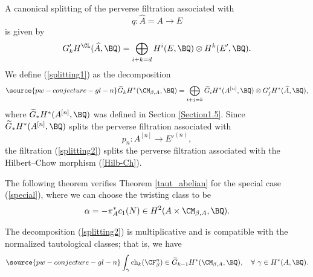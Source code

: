 A canonical splitting of the perverse filtration associated with
\[
q: \widehat{A} =A \to E
\]
is given by
\[
G'_kH^\CL(\widehat{A}, \BQ) = \bigoplus_{i+k =d} H^i(E, \BQ)\otimes H^k(E',\BQ).
\]
We define (\ref{splitting1}) as the decomposition
\begin{equation}\label{splitting2}
\source{pw-conjecture-gl-n}
\widetilde{G}_kH^\ast(\CM_{\beta, A}, \BQ) = \bigoplus_{i+j=k}  \widetilde{G}_i H^\ast(A^{[n]}, \BQ) \otimes G'_jH^\ast(\widehat{A},\BQ),
\end{equation}
where
$\widetilde{G}_\ast H^\ast(A^{[n]}, \BQ)$ was defined in Section \ref{Section1.5}.
Since $\widetilde{G}_\ast H^\ast(A^{[n]}, \BQ)$ splits the perverse filtration associated with
\[
p_n:  A^{[n]} \to E'^{(n)},
\]
the filtration (\ref{splitting2}) splits the perverse filtration associated with the Hilbert--Chow morphism (\ref{Hilb-Ch}).

The following theorem verifies Theorem \ref{taut_abelian} for the special case (\ref{special}), where we can choose the twisting class to be
\[
\alpha = - \pi_A^* c_1(N) \in H^2(A\times \CM_{\beta,A}, \BQ).
\]

\begin{thm}
\notready\label{Step1}
The decomposition (\ref{splitting2}) is multiplicative and is compatible with the normalized tautological classes; that is, we have
\begin{equation}\label{1}
\source{pw-conjecture-gl-n}
\int_\gamma \mathrm{ch}_k(\CF^n_\beta) \in \widetilde{G}_{k-1} H^\ast(\CM_{\beta,A}, \BQ),\quad \forall~\gamma \in H^\ast(A, \BQ).
\end{equation}
\end{thm}

